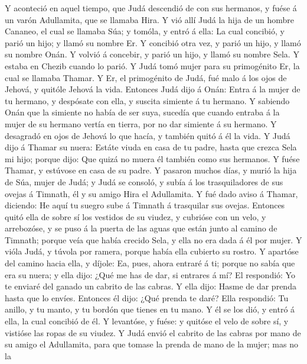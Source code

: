  Y aconteció en aquel tiempo, que Judá descendió de con sus
hermanos, y fuése á un varón Adullamita, que se llamaba Hira.
 Y vió allí Judá la hija de un hombre Cananeo, el cual se
llamaba Súa; y tomóla, y entró á ella:  La cual concibió, y
parió un hijo; y llamó su nombre Er.  Y concibió otra vez, y
parió un hijo, y llamó su nombre Onán.  Y volvió á concebir,
y parió un hijo, y llamó su nombre Sela. Y estaba en Chezib cuando lo
parió.  Y Judá tomó mujer para su primogénito Er, la cual se
llamaba Thamar.  Y Er, el primogénito de Judá, fué malo á
los ojos de Jehová, y quitóle Jehová la vida.  Entonces Judá
dijo á Onán: Entra á la mujer de tu hermano, y despósate con ella, y
suscita simiente á tu hermano.  Y sabiendo Onán que la
simiente no había de ser suya, sucedía que cuando entraba á la mujer de
su hermano vertía en tierra, por no dar simiente á su hermano.
 Y desagradó en ojos de Jehová lo que hacía, y también
quitó á él la vida.  Y Judá dijo á Thamar su nuera: Estáte
viuda en casa de tu padre, hasta que crezca Sela mi hijo; porque dijo:
Que quizá no muera él también como sus hermanos. Y fuése Thamar, y
estúvose en casa de su padre.  Y pasaron muchos días, y
murió la hija de Súa, mujer de Judá; y Judá se consoló, y subía á los
trasquiladores de sus ovejas á Timnath, él y su amigo Hira el
Adullamita.  Y fué dado aviso á Thamar, diciendo: He aquí
tu suegro sube á Timnath á trasquilar sus ovejas.  Entonces
quitó ella de sobre sí los vestidos de su viudez, y cubrióse con un
velo, y arrebozóse, y se puso á la puerta de las aguas que están junto
al camino de Timnath; porque veía que había crecido Sela, y ella no era
dada á él por mujer.  Y vióla Judá, y túvola por ramera,
porque había ella cubierto su rostro.  Y apartóse del
camino hacia ella, y díjole: Ea, pues, ahora entraré á ti; porque no
sabía que era su nuera; y ella dijo: ¿Qué me has de dar, si entrares á
mí?  El respondió: Yo te enviaré del ganado un cabrito de
las cabras. Y ella dijo: Hasme de dar prenda hasta que lo envíes.
 Entonces él dijo: ¿Qué prenda te daré? Ella respondió: Tu
anillo, y tu manto, y tu bordón que tienes en tu mano. Y él se los dió,
y entró á ella, la cual concibió de él.  Y levantóse, y
fuése: y quitóse el velo de sobre sí, y vistióse las ropas de su viudez.
 Y Judá envió el cabrito de las cabras por mano de su amigo
el Adullamita, para que tomase la prenda de mano de la mujer; mas no la
